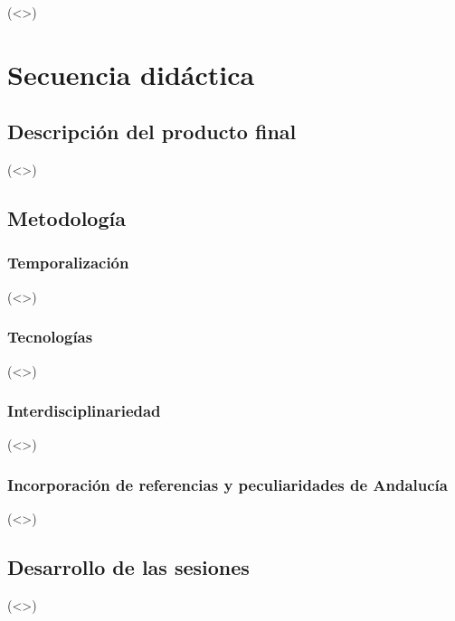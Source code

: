 \documentclass[12pt]{article}
\begin{document}
(<>)

\section{Secuencia didáctica}

\subsection{Descripción del producto final}

(<>)

\subsection{Metodología}

\subsubsection{Temporalización}

(<>)

\subsubsection{Tecnologías}

(<>)

\subsubsection{Interdisciplinariedad}

(<>)

\subsubsection{Incorporación de referencias y peculiaridades de Andalucía}

(<>)

\subsection{Desarrollo de las sesiones}

(<>)
\end{document}
